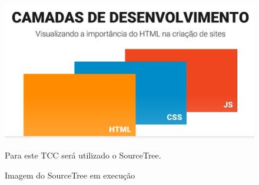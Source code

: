 	\begin{figure}[H]
		\centering
		\caption{Imagem do SourceTree em execução}
		\centering
		\includegraphics[scale=0.9]{./images/Figure_4}	
		
		Para este TCC será utilizado o SourceTree.	
		
		\label{fig:Fig4}
	\end{figure}
